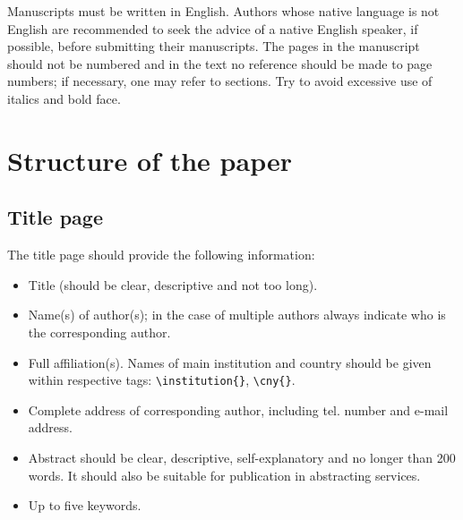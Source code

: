 \documentclass[jhs]{iosart2x}
\begin{document}
Manuscripts must be written in English. Authors whose native language is not English are recommended to seek the advice of a native English speaker,
if possible, before submitting their manuscripts. The pages in the manuscript should not be numbered and in the text no reference should be made
to page numbers; if necessary, one may refer to sections. Try to avoid excessive use of italics and bold face.


\section{Structure of the paper}
\subsection{Title page}

The title page should provide the following information:

\begin{itemize}
\item Title (should be clear, descriptive and not too long).
\item  Name(s) of author(s); in the case of multiple authors always indicate who is the corresponding
author.
\item  Full affiliation(s). Names of main institution and country should be given within respective tags: \verb|\institution{}|, \verb|\cny{}|.
\item  Complete address of corresponding author, including tel. number and e-mail address.
\item  Abstract should be clear, descriptive, self-expla\-na\-tory and no longer than 200
words. It should also be suitable for publication in abstracting services.
\item  Up to five keywords.
\end{itemize}
\end{document}
